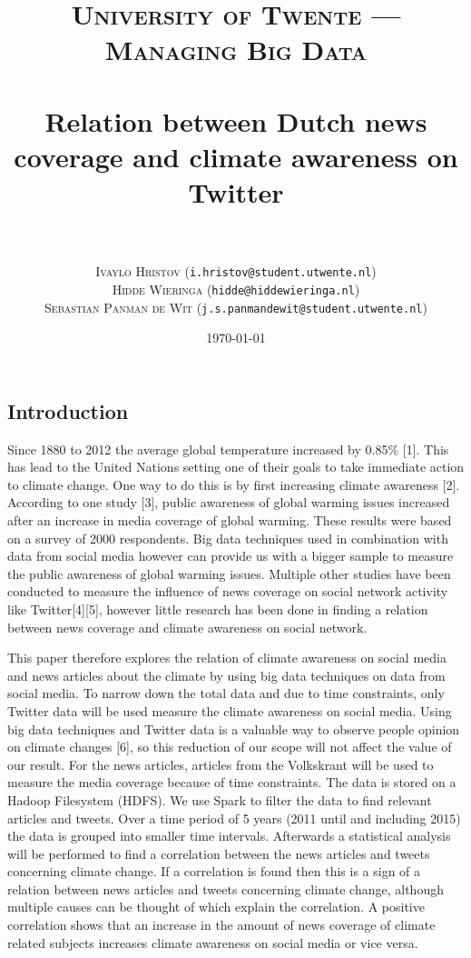 \documentclass[paper=a4, fontsize=9px]{scrartcl} %
\title{	
\normalfont \normalsize 
\textsc{University of Twente --- Managing Big Data} \\ [5pt] %
\horrule{0.5pt} \\[0.4cm] %
\huge Relation between Dutch news coverage and climate awareness on Twitter \\ %
\horrule{2pt} \\[0.0cm] %
}
\author{{\small \textsc{Ivaylo Hristov} (\texttt{i.hristov@student.utwente.nl})}\\{\small \textsc{Hidde Wieringa} (\texttt{hidde@hiddewieringa.nl})}\\{\small \textsc{Sebastian Panman de Wit} (\texttt{j.s.panmandewit@student.utwente.nl})}} %
\date{\normalsize\today} %
\numberwithin{equation}{section} %
\numberwithin{figure}{section} %
\numberwithin{table}{section} %
\begin{document}
\maketitle %

\begin{multicols}{2}

\section{Introduction}

Since 1880 to 2012 the average global temperature increased by 0.85\% [1]. This has lead to the United Nations setting one of their goals to take immediate action to climate change. One way to do this is by first increasing climate awareness [2]. According to one study [3], public awareness of global warming issues increased after an increase in media coverage of global warming. These results were based on a survey of 2000 respondents. Big data techniques used in combination with data from social media however can provide us with a bigger sample to measure the public awareness of global warming issues. Multiple other studies have been conducted to measure the influence of news coverage on social network activity like Twitter[4][5], however little research has been done in finding a relation between news coverage and climate awareness on social network.

This paper therefore explores the relation of climate awareness on social media and news articles about the climate by using big data techniques on data from social media. To narrow down the total data and due to time constraints, only Twitter data will be used measure the climate awareness on social media. Using big data techniques and Twitter data is a valuable way to observe people opinion on climate changes [6], so this reduction of our scope will not affect the value of our result. For the news articles, articles from the Volkskrant will be used to measure the media coverage because of time constraints. The data is stored on a Hadoop Filesystem (HDFS). We use Spark to filter the data to find relevant articles and tweets. Over a time period of 5 years (2011 until and including 2015) the data is grouped into smaller time intervals. Afterwards a statistical analysis will be performed to find a correlation between the news articles and tweets concerning climate change. If a correlation is found then this is a sign of a relation between news articles and tweets concerning climate change, although multiple causes can be thought of which explain the correlation. A positive correlation shows that an increase in the amount of news coverage of climate related subjects increases climate awareness on social media or vice versa.


\end{multicols}
\end{document}
